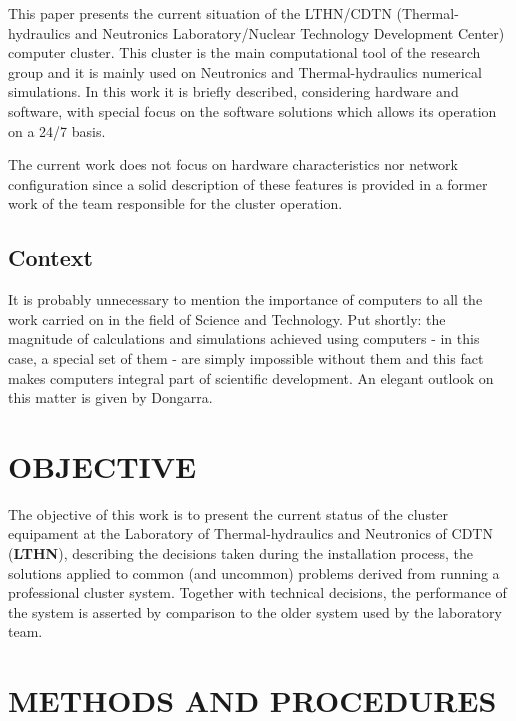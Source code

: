 \documentclass[twoside,a4paper,12pt,english]{inac19}
\begin{document}
This paper presents the current situation of the LTHN/CDTN (Thermal-hydraulics and Neutronics
Laboratory/Nuclear Technology Development Center) computer cluster. This cluster is the main 
computational tool of the research group and it is mainly used on Neutronics and Thermal-hydraulics 
numerical simulations. In this work it is briefly described, considering hardware and software, 
with special focus on the software solutions which allows its operation on a 24/7 basis.

The current work does not focus on hardware characteristics nor network configuration since 
a solid description of these features is provided in a former work of the team responsible 
for the cluster operation\cite{cluster17}.

\subsection{Context}

It is probably unnecessary to mention the importance of computers to all the work carried on 
in the field of Science and Technology. Put shortly: the magnitude of calculations and simulations 
achieved using computers - in this case, a special set of them - are simply impossible without 
them and this fact makes computers integral part of scientific development. An elegant outlook 
on this matter is given by Dongarra\cite{Dongarra2017}.

\section{OBJECTIVE}

The objective of this work is to present the current status of the cluster equipament 
at the Laboratory of Thermal-hydraulics and Neutronics of CDTN (\textbf{LTHN}), describing the decisions 
taken during the installation process, the solutions applied to common (and uncommon) problems 
derived from running a professional cluster system. Together with technical decisions, the 
performance of the system is asserted by comparison to the older system used by the laboratory 
team. 


\section{METHODS AND PROCEDURES}
\end{document}
